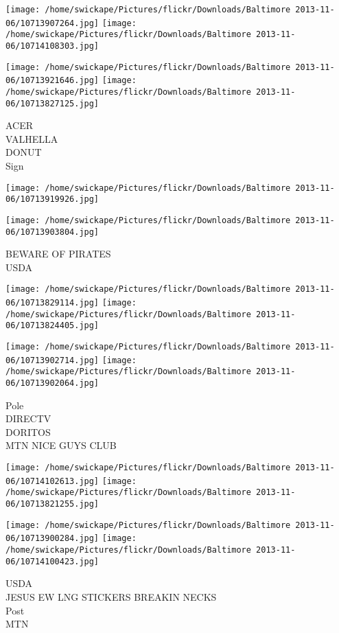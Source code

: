 \documentclass[10pt,letterpaper]{article}
\begin{document}
\texttt{[image: /home/swickape/Pictures/flickr/Downloads/Baltimore 2013-11-06/10713907264.jpg]}
\texttt{[image: /home/swickape/Pictures/flickr/Downloads/Baltimore 2013-11-06/10714108303.jpg]}

\texttt{[image: /home/swickape/Pictures/flickr/Downloads/Baltimore 2013-11-06/10713921646.jpg]}
\texttt{[image: /home/swickape/Pictures/flickr/Downloads/Baltimore 2013-11-06/10713827125.jpg]}

ACER\\
VALHELLA\\
DONUT\\
Sign
\pagebreak

\texttt{[image: /home/swickape/Pictures/flickr/Downloads/Baltimore 2013-11-06/10713919926.jpg]}

\vspace{0.25in}
\texttt{[image: /home/swickape/Pictures/flickr/Downloads/Baltimore 2013-11-06/10713903804.jpg]}

BEWARE OF PIRATES\\
USDA
\pagebreak

\texttt{[image: /home/swickape/Pictures/flickr/Downloads/Baltimore 2013-11-06/10713829114.jpg]}
\texttt{[image: /home/swickape/Pictures/flickr/Downloads/Baltimore 2013-11-06/10713824405.jpg]}

\texttt{[image: /home/swickape/Pictures/flickr/Downloads/Baltimore 2013-11-06/10713902714.jpg]}
\texttt{[image: /home/swickape/Pictures/flickr/Downloads/Baltimore 2013-11-06/10713902064.jpg]}

Pole\\
DIRECTV\\
DORITOS\\
MTN NICE GUYS CLUB
\pagebreak

\texttt{[image: /home/swickape/Pictures/flickr/Downloads/Baltimore 2013-11-06/10714102613.jpg]}
\texttt{[image: /home/swickape/Pictures/flickr/Downloads/Baltimore 2013-11-06/10713821255.jpg]}

\texttt{[image: /home/swickape/Pictures/flickr/Downloads/Baltimore 2013-11-06/10713900284.jpg]}
\texttt{[image: /home/swickape/Pictures/flickr/Downloads/Baltimore 2013-11-06/10714100423.jpg]}

USDA\\
JESUS EW LNG STICKERS BREAKIN NECKS\\
Post\\
MTN
\pagebreak
\end{document}
